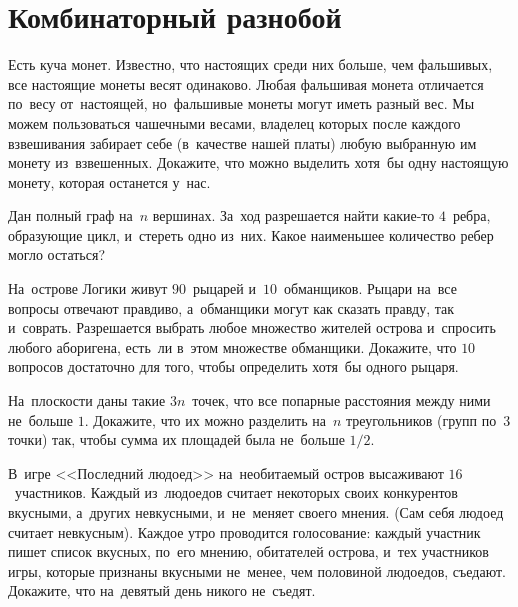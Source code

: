 
\section*{Комбинаторный разнобой}


\begin{problems}

\item
Есть куча монет.
Известно, что настоящих среди них больше, чем фальшивых, все настоящие монеты
весят одинаково.
Любая фальшивая монета отличается по~весу от~настоящей, но~фальшивые монеты
могут иметь разный вес.
Мы можем пользоваться чашечными весами, владелец которых после каждого
взвешивания забирает себе (в~качестве нашей платы) любую выбранную им монету
из~взвешенных.
Докажите, что можно выделить хотя~бы одну настоящую монету, которая останется
у~нас.

\item
Дан полный граф на~$n$ вершинах.
За~ход разрешается найти какие-то $4$~ребра, образующие цикл, и~стереть одно
из~них.
Какое наименьшее количество ребер могло остаться?

\item
На~острове Логики живут $90$~рыцарей и~$10$~обманщиков.
Рыцари на~все вопросы отвечают правдиво, а~обманщики могут как сказать правду,
так и~соврать.
Разрешается выбрать любое множество жителей острова и~спросить любого
аборигена, есть~ли в~этом множестве обманщики.
Докажите, что $10$ вопросов достаточно для того, чтобы определить хотя~бы одного
рыцаря.

\item
На~плоскости даны такие $3 n$~точек, что все попарные расстояния между ними
не~больше $1$.
Докажите, что их можно разделить на~$n$ треугольников (групп по~$3$ точки) так,
чтобы сумма их площадей была не~больше $1 / 2$.

\item
В~игре <<Последний людоед>> на~необитаемый остров высаживают $16$~участников.
Каждый из~людоедов считает некоторых своих конкурентов вкусными, а~других
невкусными, и~не~меняет своего мнения.
(Сам себя людоед считает невкусным).
Каждое утро проводится голосование: каждый участник пишет список вкусных,
по~его мнению, обитателей острова, и~тех участников игры, которые признаны
вкусными не~менее, чем половиной людоедов, съедают.
Докажите, что на~девятый день никого не~съедят.


\end{problems}
